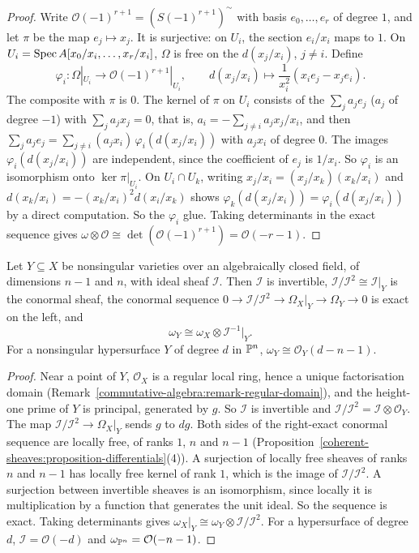 \begin{proof}
Write $\mathcal{O}(-1)^{r+1} = (S(-1)^{r+1})^\sim$ with basis $e_0, \ldots, e_r$ of degree $1$, and let $\pi$ be the map $e_j \mapsto x_j$. It is surjective: on $U_i$,
the section $e_i/x_i$ maps to $1$. On $U_i = \operatorname{Spec} A[x_0/x_i, \ldots, x_r/x_i]$, $\Omega$ is free on the $d(x_j/x_i)$, $j \neq i$. Define
\[
\varphi_i \colon \Omega|_{U_i} \to \mathcal{O}(-1)^{r+1}|_{U_i}, \qquad d(x_j/x_i) \mapsto \frac{1}{x_i^2}\left(x_ie_j - x_je_i\right) .
\]
The composite with $\pi$ is $0$. The kernel of $\pi$ on $U_i$ consists of the $\sum_ja_je_j$ ($a_j$ of degree $-1$) with $\sum_ja_jx_j = 0$, that is,
$a_i = -\sum_{j \neq i}a_jx_j/x_i$, and then $\sum_ja_je_j = \sum_{j \neq i}(a_jx_i)\,\varphi_i(d(x_j/x_i))$ with $a_jx_i$ of degree $0$. The images $\varphi_i(d(x_j/x_i))$
are independent, since the coefficient of $e_j$ is $1/x_i$. So $\varphi_i$ is an isomorphism onto $\ker\pi|_{U_i}$. On $U_i \cap U_k$, writing
$x_j/x_i = (x_j/x_k)(x_k/x_i)$ and $d(x_k/x_i) = -(x_k/x_i)^2d(x_i/x_k)$ shows $\varphi_k(d(x_j/x_i)) = \varphi_i(d(x_j/x_i))$ by a direct computation. So the $\varphi_i$
glue. Taking determinants in the exact sequence gives $\omega \otimes \mathcal{O} \cong \det(\mathcal{O}(-1)^{r+1}) = \mathcal{O}(-r-1)$.
\end{proof}

\begin{proposition}[Adjunction]\label{coherent-sheaves:proposition-adjunction}
Let $Y \subseteq X$ be nonsingular varieties over an algebraically closed field, of dimensions $n - 1$ and $n$, with ideal sheaf $\mathcal{I}$. Then
$\mathcal{I}$ is invertible, $\mathcal{I}/\mathcal{I}^2 \cong \mathcal{I}|_Y$ is the conormal sheaf, the conormal sequence
$0 \to \mathcal{I}/\mathcal{I}^2 \to \Omega_X|_Y \to \Omega_Y \to 0$ is exact on the left, and
\[
\omega_Y \cong \omega_X \otimes \mathcal{I}^{-1}|_Y .
\]
For a nonsingular hypersurface $Y$ of degree $d$ in $\mathbb{P}^n$, $\omega_Y \cong \mathcal{O}_Y(d - n - 1)$.
\end{proposition}

\begin{proof}
Near a point of $Y$, $\mathcal{O}_X$ is a regular local ring, hence a unique factorisation domain (Remark~\ref{commutative-algebra:remark-regular-domain}),
and the height-one prime of $Y$ is principal, generated by $g$. So $\mathcal{I}$ is invertible and $\mathcal{I}/\mathcal{I}^2 = \mathcal{I} \otimes \mathcal{O}_Y$. The map
$\mathcal{I}/\mathcal{I}^2 \to \Omega_X|_Y$ sends $g$ to $dg$. Both sides of the right-exact conormal sequence are locally free, of ranks $1$, $n$ and $n - 1$
(Proposition~\ref{coherent-sheaves:proposition-differentials}(4)). A surjection of locally free sheaves of ranks $n$ and $n - 1$ has locally free
kernel of rank $1$, which is the image of $\mathcal{I}/\mathcal{I}^2$. A surjection between invertible sheaves is an isomorphism, since locally it is
multiplication by a function that generates the unit ideal. So the sequence is exact. Taking
determinants gives $\omega_X|_Y \cong \omega_Y \otimes \mathcal{I}/\mathcal{I}^2$. For a hypersurface of degree $d$, $\mathcal{I} = \mathcal{O}(-d)$ and $\omega_{\mathbb{P}^n} = \mathcal{O}(-n-1)$.
\end{proof}


